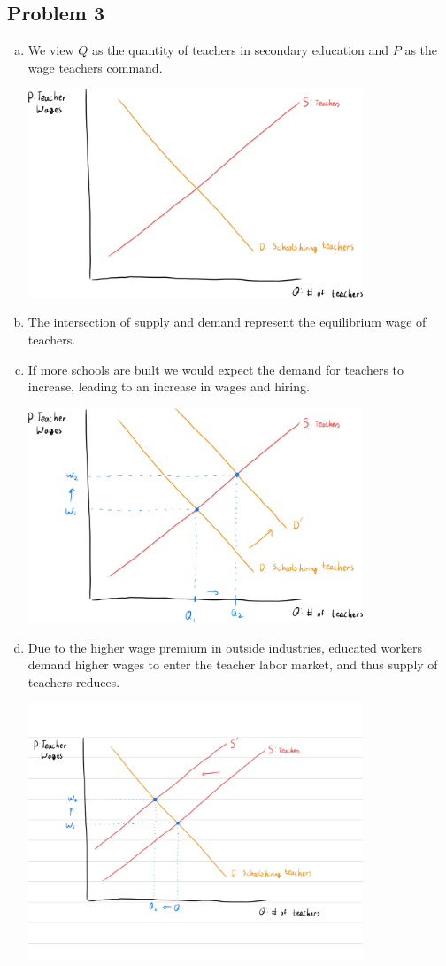 \documentclass[8pt]{extarticle}
\begin{document}
\subsection{Problem 3}%
\begin{enumerate}[(a)]
  \item We view $Q$ as the quantity of teachers in secondary education and $P$ as the wage teachers command.
    \begin{center}
      \includegraphics[width=10cm]{images/ps2q3a.png}
    \end{center}
  \item The intersection of supply and demand represent the equilibrium wage of teachers.
  \item If more schools are built we would expect the demand for teachers to increase, leading to an increase in wages and hiring.
    \begin{center}
      \includegraphics[width=10cm]{images/ps2q3c.png}
    \end{center}
  \item Due to the higher wage premium in outside industries, educated workers demand higher wages to enter the teacher labor market, and thus supply of teachers reduces.
    \begin{center}
      \includegraphics[width=10cm]{images/ps2q3d.pdf}

\end{center}
\end{enumerate}
\end{document}
